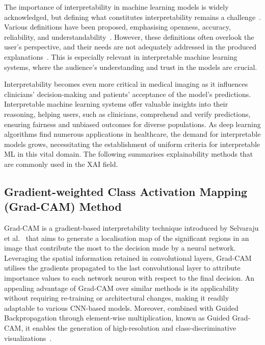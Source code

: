 \documentclass[dvipsnames]{article}
\renewcommand{\cite}[1]{\autocite{#1}}
\begin{document}
The importance of interpretability in machine learning models is widely acknowledged, but defining what constitutes interpretability remains a challenge~\cite{Lipton2016mythos}. Various definitions have been proposed, emphasising openness, accuracy, reliability, and understandability~\cite{Lipton2016mythos, Freitas2013comprehensible}. However, these definitions often overlook the user's perspective, and their needs are not adequately addressed in the produced explanations~\cite{Miller17a}. This is especially relevant in interpretable machine learning systems, where the audience's understanding and trust in the models are crucial.


Interpretability becomes even more critical in medical imaging as it influences clinicians' decision-making and patients' acceptance of the model's predictions. Interpretable machine learning systems offer valuable insights into their reasoning, helping users, such as clinicians, comprehend and verify predictions, ensuring fairness and unbiased outcomes for diverse populations. As deep learning algorithms find numerous applications in healthcare, the demand for interpretable models grows, necessitating the establishment of uniform criteria for interpretable ML in this vital domain.
The following summarises explainability methods that are commonly used in the XAI field.




\subsection{Gradient-weighted Class Activation Mapping (Grad-CAM) Method}

Grad-CAM is a gradient-based interpretability technique introduced by Selvaraju et al.~\cite{selvaraju2017grad} that aims to generate a localisation map of the significant regions in an image that contribute the most to the decision made by a neural network. Leveraging the spatial information retained in convolutional layers, Grad-CAM utilises the gradients propagated to the last convolutional layer to attribute importance values to each network neuron with respect to the final decision. An appealing advantage of Grad-CAM over similar methods is its applicability without requiring re-training or architectural changes, making it readily adaptable to various CNN-based models. Moreover, combined with Guided Backpropagation through element-wise multiplication, known as Guided Grad-CAM, it enables the generation of high-resolution and class-discriminative visualizations~\cite{selvaraju2017grad}.
\end{document}
